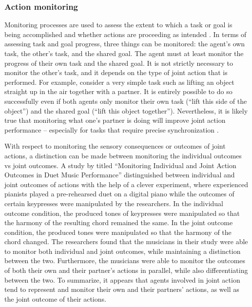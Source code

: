 \documentclass[10pt,a4paper,onecolumn]{article}
\begin{document}
\hypertarget{action-monitoring}{%
\subsubsection{Action monitoring}\label{action-monitoring}}

Monitoring processes are used to assess the extent to which a task or goal is being accomplished and whether actions are proceeding as intended \autocite{botvinickConflictMonitoringCognitive2001}. In terms of assessing task and goal progress, three things can be monitored: the agent's own task, the other's task, and the shared goal. The agent must at least monitor the progress of their own task and the shared goal. It is not strictly necessary to monitor the other's task, and it depends on the type of joint action that is performed. For example, consider a very simple task such as lifting an object straight up in the air together with a partner. It is entirely possible to do so successfully even if both agents only monitor their own task (``lift this side of the object'') and the shared goal (``lift this object together''). Nevertheless, it is likely true that monitoring what one's partner is doing will improve joint action performance -- especially for tasks that require precise synchronization \autocite{vesperMinimalArchitectureJoint2010}.

With respect to monitoring the sensory consequences or outcomes of joint actions, a distinction can be made between monitoring the individual outcomes vs joint outcomes. A study by \textcite{loehrMonitoringIndividualJoint2013} titled ``Monitoring Individual and Joint Action Outcomes in Duet Music Performance'' distinguished between individual and joint outcomes of actions with the help of a clever experiment, where experienced pianists played a pre-rehearsed duet on a digital piano while the outcomes of certain keypresses were manipulated by the researchers. In the individual outcome condition, the produced tones of keypresses were manipulated so that the harmony of the resulting chord remained the same. In the joint outcome condition, the produced tones were manipulated so that the harmony of the chord changed. The researchers found that the musicians in their study were able to monitor both individual and joint outcomes, while maintaining a distinction between the two. Furthermore, the musicians were able to monitor the outcomes of both their own and their partner's actions in parallel, while also differentiating between the two. To summarize, it appears that agents involved in joint action tend to represent and monitor their own and their partners' actions, as well as the joint outcome of their actions.
\end{document}

